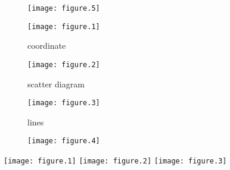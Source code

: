 \documentclass[12pt]{article}
\begin{document}
\begin{figure}
    \begin{minipage}[t]{10cm}
      \centering
      \texttt{[image: figure.5]}
    \end{minipage}
    
    \begin{minipage}[t]{10cm}
      \centering
      \texttt{[image: figure.1]}
      \centerline{coordinate}
    \end{minipage}

    \begin{minipage}[t]{10cm}
      \centering
      \texttt{[image: figure.2]}
      \centerline{scatter diagram}
    \end{minipage}

    \begin{minipage}[t]{10cm}
      \centering
      \texttt{[image: figure.3]}
      \centerline{lines}
    \end{minipage}

    \begin{minipage}[t]{10cm}
      \centering
      \texttt{[image: figure.4]}
    \end{minipage}
\end{figure}
\texttt{[image: figure.1]}
\texttt{[image: figure.2]}
\texttt{[image: figure.3]}
\end{document}
